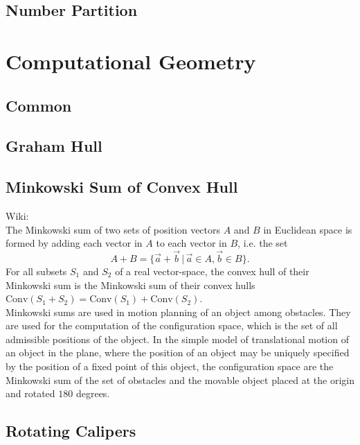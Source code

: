 ﻿\documentclass[10pt]{article}
\begin{document}
\subsection{Number Partition} {

\section{Computational Geometry}
\subsection{Common}

\subsection{Graham Hull}

\subsection{Minkowski Sum of Convex Hull}
\noindent
Wiki: \\
The Minkowski sum of two sets of position vectors $A$ and $B$ in Euclidean space is formed by adding each vector in $A$ to each vector in $B$, i.e. the set
\begin{displaymath}
A+B=\{ \vec{a} + \vec{b} \, | \, \vec{a} \in A, \vec{b} \in B \}.
\end{displaymath}
For all subsets $S_1$ and $S_2$ of a real vector-space, the convex hull of their Minkowski sum is the Minkowski sum of their convex hulls $\mathrm{Conv} (S_1 + S_2) = \mathrm{Conv} (S_1) + \mathrm{Conv} (S_2)$. \\
Minkowski sums are used in motion planning of an object among obstacles. They are used for the computation of the configuration space, which is the set of all admissible positions of the object. In the simple model of translational motion of an object in the plane, where the position of an object may be uniquely specified by the position of a fixed point of this object, the configuration space are the Minkowski sum of the set of obstacles and the movable object placed at the origin and rotated $180$ degrees. \\

\subsection{Rotating Calipers}

}
\end{document}
